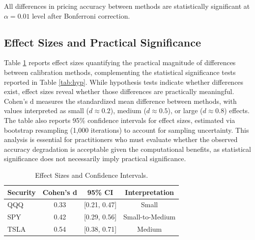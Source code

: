 \documentclass[12pt,a4paper]{article}
\begin{document}
All differences in pricing accuracy between methods are statistically significant at $\alpha = 0.01$ level after Bonferroni correction.

\subsection{Effect Sizes and Practical Significance}

Table \ref{tab:effect} reports effect sizes quantifying the practical magnitude of differences between calibration methods, complementing the statistical significance tests reported in Table \ref{tab:hyp}. While hypothesis tests indicate whether differences exist, effect sizes reveal whether those differences are practically meaningful. Cohen's d measures the standardized mean difference between methods, with values interpreted as small ($d \approx 0.2$), medium ($d \approx 0.5$), or large ($d \approx 0.8$) effects. The table also reports 95\% confidence intervals for effect sizes, estimated via bootstrap resampling (1,000 iterations) to account for sampling uncertainty. This analysis is essential for practitioners who must evaluate whether the observed accuracy degradation is acceptable given the computational benefits, as statistical significance does not necessarily imply practical significance.

\begin{table}[H]

\centering

\caption{Effect Sizes and Confidence Intervals.}

\label{tab:effect}

\begin{tabular}{lccc}

\toprule

\textbf{Security} & \textbf{Cohen's d} & \textbf{95\% CI} & \textbf{Interpretation} \\

\midrule

QQQ & 0.33 & [0.21, 0.47] & Small \\

SPY & 0.42 & [0.29, 0.56] & Small-to-Medium \\

TSLA & 0.54 & [0.38, 0.71] & Medium \\

\bottomrule

\end{tabular}

\end{table}
\end{document}
